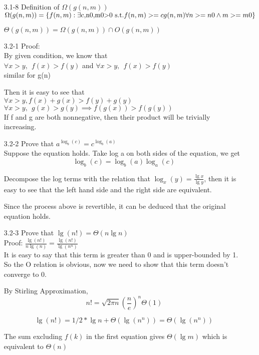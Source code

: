 \documentclass[]{article}
\begin{document}
\begin{enumerate}
\item[3.1-8] Definition of $\Omega(g(n,m))$\\
$ \Omega(g(n,m)) = \\ \{ f(n,m): \exists \text{c,n0,m0$>$0 s.t.} f(n,m)>=cg(n,m) \forall n>=n0 \wedge m>=m0 \}$

$\Theta(g(n,m)) = \Omega(g(n,m)) \cap O(g(n,m)) $

\item[3.2-1] Proof: \\
By given condition, we know that\\ $\forall x>y,\ \ f(x)>f(y)$ and $\forall x>y,\ \ f(x)>f(y)$\\
similar for g(n)

Then it is easy to see that\\ $ \forall x>y, f(x)+g(x)>f(y)+g(y) $\\
$ \forall x>y,\ \ g(x)>g(y)\implies f(g(x))>f(g(y)) $\\
If f and g are both nonnegative, then their product will be trivially increasing.

\item[3.2-2] Prove that $ a^{\log_b(c)} = c^{\log_b(a)} $\\
Suppose the equation holds. Take log a on both sides of the equation, we get $$ \log_b(c) = \log_b(a) \log_a(c) $$

Decompose the log terms with the relation that $ \log_x(y) = \frac{\lg x}{\lg y} $, then it is easy to see that the left hand side and the right side are equivalent.

Since the process above is revertible, it can be deduced that the original equation holds.

\item[3.2-3] Prove that $\lg(n!) = \Theta(n\lg n)$\\
Proof: $\frac{\lg(n!)}{n\lg(n)} = \frac{\lg(n!)}{\lg(n^n)}$\\

It is easy to say that this term is greater than 0 and is upper-bounded by 1. So the O relation is obvious, now we need to show that this term doesn't converge to 0. 

By Stirling Approximation, 
$$
n! = \sqrt{2\pi n}(\frac{ n}{e})^{n}\Theta(1)
$$

$$ \lg(n!) = 1/2*\lg n + \Theta(\lg(n^n)) = \Theta(\lg(n^n))$$


The sum excluding $f(k)$ in the first equation gives $ \Theta(\lg m) $ which is equivalent to $ \Theta(n) $ 




\end{enumerate}
\end{document}
